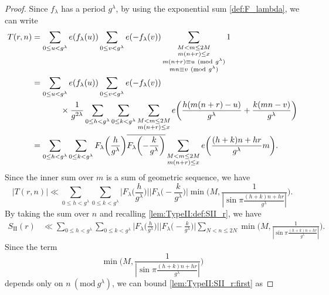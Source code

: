 \documentclass[hidelinks]{amsart}
\numberwithin{equation}{section}
\theoremstyle{plain}
\theoremstyle{definition}
\renewcommand{\mod}[1]{(\mathrm{mod}\ #1)}
\begin{document}
\begin{proof}
Since $f_{\lambda}$ has a period $g^{\lambda}$,
by using the exponential sum \cref{def:F_lambda}, we can write
\begin{align}
T(r,n)
&=
\sum_{0\le u<g^{\lambda}}
e(f_{\lambda}(u))
\sum_{0\le v<g^{\lambda}}
e(-f_{\lambda}(v))
\sum_{\substack{
M<m\le 2M\\
m(n+r)\le x\\
m(n+r)\equiv u\ \mod{g^{\lambda}}\\
mn\equiv v\ \mod{g^{\lambda}}
}}
1\\
&=
\sum_{0\le u<g^{\lambda}}
e(f_{\lambda}(u))
\sum_{0\le v<g^{\lambda}}
e(-f_{\lambda}(v))\\
&\hspace{0.1\textwidth}
\times
\frac{1}{g^{2\lambda}}
\sum_{0\le h<g^{\lambda}}
\sum_{0\le k<g^{\lambda}}
\sum_{\substack{
M<m\le 2M\\
m(n+r)\le x
}}
e\biggl(\frac{h(m(n+r)-u)}{g^{\lambda}}+\frac{k(mn-v)}{g^{\lambda}}\biggr)\\
&=
\sum_{0\le h<g^{\lambda}}
\sum_{0\le k<g^{\lambda}}
F_{\lambda}\biggl(\frac{h}{g^{\lambda}}\biggr)
\overline{F_{\lambda}\biggl(-\frac{k}{g^{\lambda}}\biggr)}
\sum_{\substack{
M<m\le 2M\\
m(n+r)\le x
}}
e\biggl(\frac{(h+k)n+hr}{g^{\lambda}}m\biggr).
\end{align}
Since the inner sum over $m$ is a sum of geometric sequence, we have
\begin{equation}
\label{TypeII:Tn:geometric_seq}
|T(r,n)|
\ll
\sum_{0\le h<g^{\lambda}}
\sum_{0\le k<g^{\lambda}}
\biggl|F_{\lambda}\biggl(\frac{h}{g^{\lambda}}\biggr)\biggr|
\biggl|F_{\lambda}\biggl(-\frac{k}{g^{\lambda}}\biggr)\biggr|
\min\biggl(
M,
\frac{1}{|\sin\pi\frac{(h+k)n+hr}{g^{\lambda}}|}
\biggr).
\end{equation}
By taking the sum over $n$ and recalling \cref{lem:TypeII:def:SII_r}, we have
\begin{equation}
\label{lem:TypeII:SII_r:first}
\begin{aligned}
S_{\mathrm{II}}(r)
&\ll
\sum_{0\le h<g^{\lambda}}
\sum_{0\le k<g^{\lambda}}
\biggl|F_{\lambda}\biggl(\frac{h}{g^{\lambda}}\biggr)\biggr|
\biggl|F_{\lambda}\biggl(-\frac{k}{g^{\lambda}}\biggr)\biggr|
\sum_{N<n\le2N}
\min\biggl(
M,
\frac{1}{|\sin\pi\frac{(h+k)n+hr}{g^{\lambda}}|}
\biggr).
\end{aligned}
\end{equation}
Since the term
\[
\min\biggl(
M,
\frac{1}{|\sin\pi\frac{(h+k)n+hr}{g^{\lambda}}|}
\biggr)
\]
depends only on $n\ \mod{g^{\lambda}}$, we can bound \cref{lem:TypeII:SII_r:first} as

\end{proof}
\end{document}
